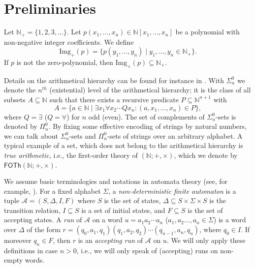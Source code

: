 \documentclass[envcountsame]{llncs}
\newcommand{\A}{\mathcal A}
\newcommand{\FOTh}{\mathsf{FOTh}}
\newcommand{\Img}{\mathrm{Img}}
\newcommand{\N}{\mathbb N}
\begin{document}
\section{Preliminaries} \label{sec:prelim}

Let $\N_+ = \{1,2,3,\ldots\}$. Let $p(x_1,\ldots,x_n) \in \N[x_1,\ldots,x_n]$
be a polynomial with non-negative integer coefficients.
We define
$$
\Img_+(p) = \{ p(y_1,\ldots,y_n) \mid y_1,\ldots,y_n \in \N_+\}.
$$
If $p$ is not the zero-polynomial, then $\Img_+(p) \subseteq \N_+$.

Details on the arithmetical hierarchy can be found for instance
in \cite{Rogers}. With $\Sigma^0_n$ we denote the $n^{th}$
(existential) level of the arithmetical hierarchy; it is the class
of all subsets $A \subseteq \mathbb{N}$ such that
there exists a recursive predicate $P \subseteq \mathbb{N}^{n+1}$
with
$$
A = \{ a \in \mathbb{N}\mid \exists x_1 \forall x_2 \cdots Q x_n : (a,x_1,\ldots,x_n) \in P \},
$$
where $Q = \exists$ ($Q = \forall$) for $n$ odd (even).
The set of complements of $\Sigma^0_n$-sets is denoted
by $\Pi^0_n$. By fixing some effective encoding of strings
by natural numbers, we can talk about $\Sigma^0_n$-sets and 
$\Pi^0_n$-sets of strings over an arbitrary alphabet.
A typical example of a set, which does not belong
to the arithmetical hierarchy is {\em true arithmetic}, i.e., 
the first-order theory of $(\mathbb{N};+,\times)$, which we denote 
by $\FOTh(\mathbb{N};+,\times)$. 

We assume basic terminologies and notations in automata theory 
(see, for example, \cite{HoUl79}).
For a fixed alphabet $\Sigma$, a {\em non-deterministic finite automaton} is a
tuple $\A=(S, \Delta, I, F)$ where $S$ is the set of states,
$\Delta \subseteq S \times \Sigma \times S$
is the transition relation, $I\subseteq S$
is a set of initial states, and $F\subseteq S$ is the set of accepting states.
A {\em run} of $\A$ on a word $u = a_1 a_2 \cdots a_n$ ($a_1, a_2 \ldots,a_n \in \Sigma$)
is a word over $\Delta$ of the form $r = (q_0, a_1, q_1) (q_1, a_2, q_2) \cdots (q_{n-1}, a_n, q_n)$,
where $q_0 \in I$. If moreover $q_n \in F$, then  $r$ is an {\em accepting run} of $\A$ on $u$.
We will only apply these definitions in case $n > 0$, i.e., we will only speak of (accepting)
runs on non-empty words.
\end{document}
